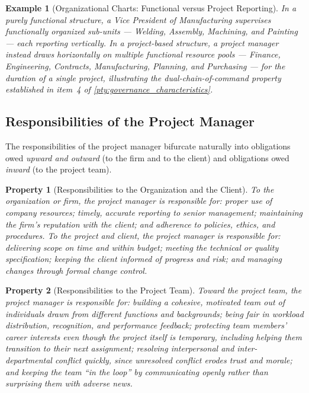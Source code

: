 \documentclass[12pt, a4paper]{report}
\theoremstyle{engnotes}
\newtheorem{property}{Property}[section]
\newtheorem{example}{Example}[section]
\begin{document}
\begin{example}[Organizational Charts: Functional versus Project Reporting]\label{ex:org_charts_pm_fm}
    In a purely functional structure, a Vice President of Manufacturing supervises functionally organized sub-units --- Welding, Assembly, Machining, and Painting --- each reporting vertically. In a project-based structure, a project manager instead draws horizontally on multiple functional resource pools --- Finance, Engineering, Contracts, Manufacturing, Planning, and Purchasing --- for the duration of a single project, illustrating the dual-chain-of-command property established in item~4 of \cref{pty:governance_characteristics}.
\end{example}

\subsection{Responsibilities of the Project Manager}
\label{subsec:pm_responsibilities}

The responsibilities of the project manager bifurcate naturally into obligations owed \emph{upward and outward} (to the firm and to the client) and obligations owed \emph{inward} (to the project team).

\begin{property}[Responsibilities to the Organization and the Client]\label{pty:pm_responsibilities_org_client}
    To the organization or firm, the project manager is responsible for: proper use of company resources; timely, accurate reporting to senior management; maintaining the firm's reputation with the client; and adherence to policies, ethics, and procedures. To the project and client, the project manager is responsible for: delivering scope on time and within budget; meeting the technical or quality specification; keeping the client informed of progress and risk; and managing changes through formal change control.
\end{property}

\begin{property}[Responsibilities to the Project Team]\label{pty:pm_responsibilities_team}
    Toward the project team, the project manager is responsible for: building a cohesive, motivated team out of individuals drawn from different functions and backgrounds; being fair in workload distribution, recognition, and performance feedback; protecting team members' career interests even though the project itself is temporary, including helping them transition to their next assignment; resolving interpersonal and inter-departmental conflict quickly, since unresolved conflict erodes trust and morale; and keeping the team ``in the loop'' by communicating openly rather than surprising them with adverse news.
\end{property}
\end{document}
